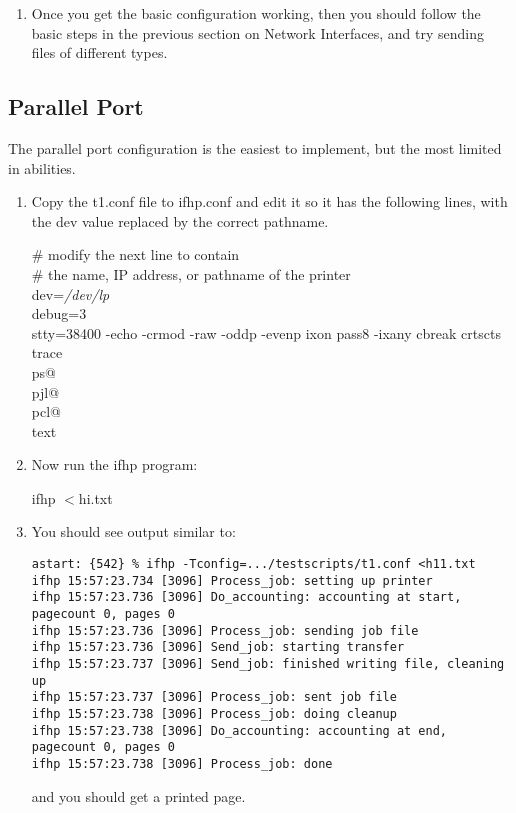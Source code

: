 \documentclass[a4paper]{article}
\begin{document}
\begin{enumerate}
\item Once you get the basic configuration working,
then you should follow the basic steps in the
previous section on Network Interfaces,
and try sending files of different types.
\end{enumerate}



\subsection{Parallel Port}

The parallel port configuration is the easiest to implement,
but the most limited in abilities.
\begin{enumerate}
\item Copy the
{\ttfamily t1.conf}
file to
{\ttfamily ifhp.conf} and edit it
so it has the following lines, with the
{\ttfamily dev} value replaced by the correct pathname.
\begin{tscreen}
\# modify the next line to contain \\ 
\#  the name, IP address, or pathname of the printer \\ 
dev={\itshape /dev/lp\/} \\ 
debug=3 \\ 
stty=38400 -echo -crmod -raw -oddp -evenp ixon pass8 -ixany cbreak crtscts \\ 
trace \\ 
ps@ \\ 
pjl@ \\ 
pcl@ \\ 
text \\ 
\end{tscreen}
\item Now run the
{\ttfamily ifhp}
program:
\begin{tscreen}
ifhp $<$hi.txt
\end{tscreen}
\item You should see output similar to:
\begin{tscreen}
\begin{verbatim}
astart: {542} % ifhp -Tconfig=.../testscripts/t1.conf <h11.txt
ifhp 15:57:23.734 [3096] Process_job: setting up printer
ifhp 15:57:23.736 [3096] Do_accounting: accounting at start, pagecount 0, pages 0
ifhp 15:57:23.736 [3096] Process_job: sending job file
ifhp 15:57:23.736 [3096] Send_job: starting transfer
ifhp 15:57:23.737 [3096] Send_job: finished writing file, cleaning up
ifhp 15:57:23.737 [3096] Process_job: sent job file
ifhp 15:57:23.738 [3096] Process_job: doing cleanup
ifhp 15:57:23.738 [3096] Do_accounting: accounting at end, pagecount 0, pages 0
ifhp 15:57:23.738 [3096] Process_job: done
\end{verbatim}
\end{tscreen}

and you should get a printed page.
\end{enumerate}
\end{document}
